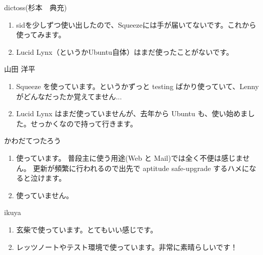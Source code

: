 \documentclass[mingoth,a4paper]{jsarticle}
\begin{document}
\begin{prework}{ dictoss(杉本　典充) }

    \begin{enumerate}
          \item sidを少しずつ使い出したので、Squeezeには手が届いてないです。これから使ってみます。
          \item Lucid Lynx（というかUbuntu自体）はまだ使ったことがないです。
    \end{enumerate}

\end{prework}


\begin{prework}{ 山田 洋平 }
    \begin{enumerate}
          \item Squeeze を使っています。というかずっと testing ばかり使っていて、Lenny がどんなだったか覚えてません...
          \item Lucid Lynx はまだ使っていませんが、去年から Ubuntu も、使い始めました。せっかくなので持って行きます。
    \end{enumerate}

\end{prework}



\begin{prework}{ かわだてつたろう }

    \begin{enumerate}
          \item 
使っています。
普段主に使う用途(Web と Mail)では全く不便は感じません。
更新が頻繁に行われるので出先で aptitude safe-upgrade するハメになると泣けます。
  \item 
使っていません。
    \end{enumerate}

\end{prework}



\begin{prework}{ ikuya }
    \begin{enumerate}
          \item 
        玄柴で使っています。とてもいい感じです。
          \item 
        レッツノートやテスト環境で使っています。非常に素晴らしいです！
    \end{enumerate}

\end{prework}
\end{document}
